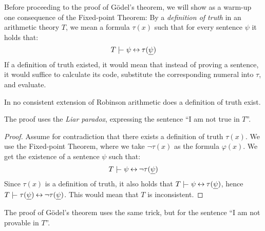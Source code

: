     Before proceeding to the proof of Gödel's theorem, we will show as a warm-up one consequence of the Fixed-point Theorem: By a \emph{definition of truth} in an arithmetic theory $T$, we mean a formula $\tau(x)$ such that for every sentence $\psi$ it holds that: 
    $$
    T\proves\psi\liff\tau(\underline{\psi})
    $$
    If a definition of truth existed, it would mean that instead of proving a sentence, it would suffice to calculate its code, substitute the corresponding numeral into $\tau$, and evaluate.
    
    \begin{theorem}
        In no consistent extension of Robinson arithmetic does a definition of truth exist.
    \end{theorem}
    The proof uses the \emph{Liar paradox}, expressing the sentence ``I am not true in $T$''.
    \begin{proof}
    Assume for contradiction that there exists a definition of truth $\tau(x)$.
    We use the Fixed-point Theorem, where we take $\neg\tau(x)$ as the formula $\varphi(x)$. We get the existence of a sentence $\psi$ such that:
    $$
    T\proves\psi\liff\neg\tau(\underline{\psi})
    $$
    Since $\tau(x)$ is a definition of truth, it also holds that $T\proves\psi\liff\tau(\underline{\psi})$, hence $T\proves\tau(\underline{\psi})\liff\neg\tau(\underline{\psi})$. This would mean that $T$ is inconsistent.
    \end{proof}
    
    The proof of Gödel's theorem uses the same trick, but for the sentence ``I am not provable in $T$''.
    
